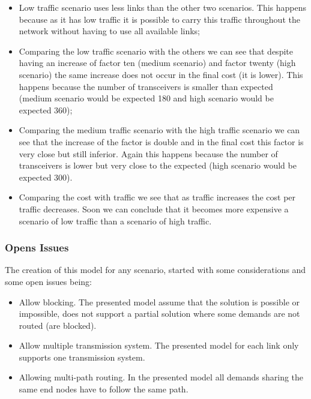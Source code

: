 \begin{itemize}
  \item Low traffic scenario uses less links than the other two scenarios. This happens because as it has low traffic it is possible to carry this traffic throughout the network without having to use all available links;
  \item Comparing the low traffic scenario with the others we can see that despite having an increase of factor ten (medium scenario) and factor twenty (high scenario) the same increase does not occur in the final cost (it is lower). This happens because the number of transceivers is smaller than expected (medium scenario would be expected 180 and high scenario would be expected 360);
  \item Comparing the medium traffic scenario with the high traffic scenario we can see that the increase of the factor is double and in the final cost this factor is very close but still inferior. Again this happens because the number of transceivers is lower but very close to the expected (high scenario would be expected 300).
  \item Comparing the cost with traffic we see that as traffic increases the cost per traffic decreases. Soon we can conclude that it becomes more expensive a scenario of low traffic than a scenario of high traffic.
\end{itemize}


\vspace{13pt}
\subsubsection{Opens Issues}

The creation of this model for any scenario, started with some considerations and some open issues being:

\begin{itemize}
  \item Allow blocking.
  \subitem The presented model assume that the solution is possible or impossible, does not support a partial solution where some demands are not routed (are blocked).
  \item Allow multiple transmission system.
  \subitem The presented model for each link only supports one transmission system.
  \item Allowing multi-path routing.
  \subitem In the presented model all demands sharing the same end nodes have to follow the same path.
\end{itemize}


